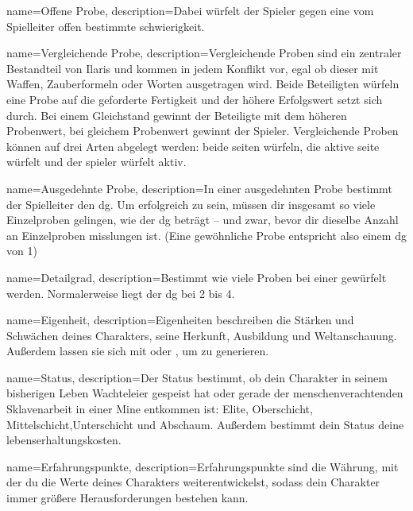 {
    name={Offene Probe},
    description={Dabei würfelt der Spieler gegen eine vom Spielleiter offen bestimmte \gls{schwierigkeit}.}}

{
    name={Vergleichende Probe},
    description={Vergleichende Proben sind ein zentraler Bestandteil von Ilaris und kommen in jedem Konflikt vor, egal ob dieser mit Waffen, Zauberformeln oder Worten ausgetragen wird. Beide Beteiligten würfeln eine Probe auf die geforderte Fertigkeit und der höhere Erfolgswert setzt sich durch. Bei einem Gleichstand gewinnt der Beteiligte mit dem höheren Probenwert, bei gleichem Probenwert gewinnt der Spieler. Vergleichende Proben können auf drei Arten abgelegt werden: \gls{beide seiten würfeln}, \gls{die aktive seite würfelt} und \gls{der spieler würfelt aktiv}.}}
        
{
    name={Ausgedehnte Probe},
    description={In einer ausgedehnten Probe bestimmt der Spielleiter den \gls{dg}. Um erfolgreich zu sein, müssen dir insgesamt so viele Einzelproben gelingen, wie der \gls{dg} beträgt – und zwar, bevor dir dieselbe Anzahl an Einzelproben
misslungen ist. (Eine gewöhnliche Probe entspricht also einem \gls{dg} von 1)}
}

{
    name={Detailgrad},
    description={Bestimmt wie viele Proben bei einer  gewürfelt werden. Normalerweise liegt der \gls{dg} bei 2 bis 4.}}

{
    name={Eigenheit},
    description={Eigenheiten beschreiben die Stärken und Schwächen deines Charakters, seine Herkunft, Ausbildung und Weltanschauung. Außerdem lassen sie sich mit   oder , um  zu generieren.}}

{
    name={Status},
    description={Der Status bestimmt, ob dein Charakter in seinem bisherigen Leben Wachteleier gespeist hat oder gerade der menschen­verachtenden Sklavenarbeit in einer Mine entkommen ist: Elite, Oberschicht, Mittelschicht,Unterschicht und Abschaum. Außerdem bestimmt dein Status deine \gls{lebenserhaltungskosten}.}}

{
    name={Erfahrungspunkte},
    description={Erfahrungspunkte sind die Währung, mit der du die Werte deines Charakters weiterentwickelst, sodass dein Charakter immer größere Herausforderungen bestehen kann.}}

